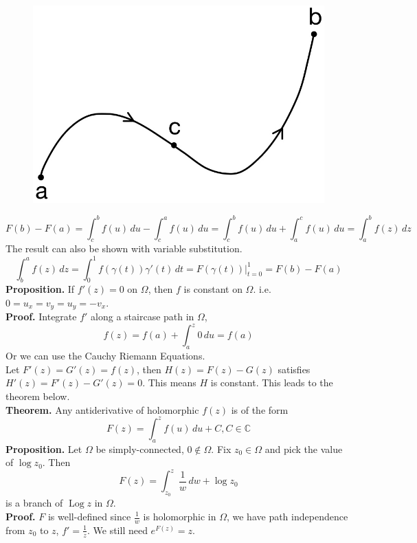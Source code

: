 \documentclass[11pt]{article}
\begin{document}
\begin{figure}[H]
\includegraphics[scale = 0.18]{12_3}
\centering
\end{figure}
$$F(b) - F(a) = \int_c^b f(u) \,du - \int_c^a f(u) \,du = \int_c^b f(u) \,du + \int_a^c f(u) \,du = \int_a^b f(z) \,dz$$
The result can also be shown with variable substitution. 
$$ \int_b^a f(z) \,dz = \int_0^1 f(\gamma(t))\gamma'(t) \,dt = F(\gamma(t))\bigg\rvert_{t = 0}^{1} = F(b) - F(a)$$
\newline
\textbf{Proposition.} If $f'(z) = 0$ on $\Omega$, then $f$ is constant on $\Omega$. i.e. $0 = u_x = v_y = u_y = -v_x $. \\
\textbf{Proof.} Integrate $f'$ along a staircase path in $\Omega$, 
$$f(z) = f(a) + \int_a^z 0 \, du = f(a)$$
Or we can use the Cauchy Riemann Equations.\\
Let $F'(z) = G'(z) = f(z)$, then $H(z) = F(z) - G(z)$ satisfies $H'(z) = F'(z) - G'(z) = 0$. This means $H$ is constant. This leads to the theorem below.  \\
\newline
\textbf{Theorem.} Any antiderivative of holomorphic $f(z)$ is of the form 
$$F(z) = \int_a^z f(u) \, du + C, C \in \mathbb{C}$$ 
\newline
\textbf{Proposition.} Let $\Omega$ be simply-connected, $0 \notin \Omega$. Fix $z_0 \in \Omega$ and pick the value of $\operatorname{log}z_0$. Then 
$$F(z) = \int_{z_0}^z \frac{1}{w} \,dw + \operatorname{log} z_0$$
is a branch of $\operatorname{Log} z $ in $\Omega$.\\
\textbf{Proof.} $F$ is well-defined since $\frac{1}{w}$ is holomorphic in $\Omega$, we have path independence from $z_0$ to $z$, $f' = \frac{1}{z}$. 
We still need $e^{F(z)} = z$.
\end{document}
